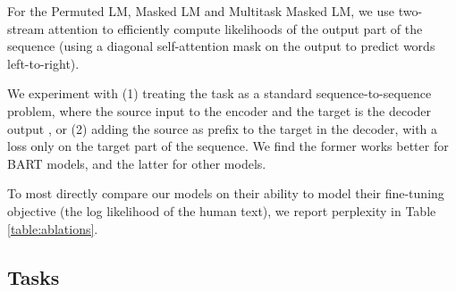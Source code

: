 \documentclass{article} %
\newcommand{\todo}[1]{{\color{red} #1}}
\newcommand{\omer}[1]{{\color{blue} [Omer: #1]}}
\begin{document}
  

For the Permuted LM, Masked LM and Multitask Masked LM, we use two-stream attention \citep{xlnet} to efficiently compute likelihoods of the output part of the sequence (using a diagonal self-attention mask on the output to predict words left-to-right). 

We experiment with (1) treating the task as a standard sequence-to-sequence problem, where the source input to the encoder and the target is the decoder output%
, or (2) adding the source as prefix to the target in the decoder, with a loss only on the target part of the sequence. %
We find the former works better for BART models, and the latter for other models.

To most directly compare our models on their ability to model their fine-tuning objective (the log likelihood of the human text), we report perplexity in Table \ref{table:ablations}. 





\subsection{Tasks}
\end{document}
